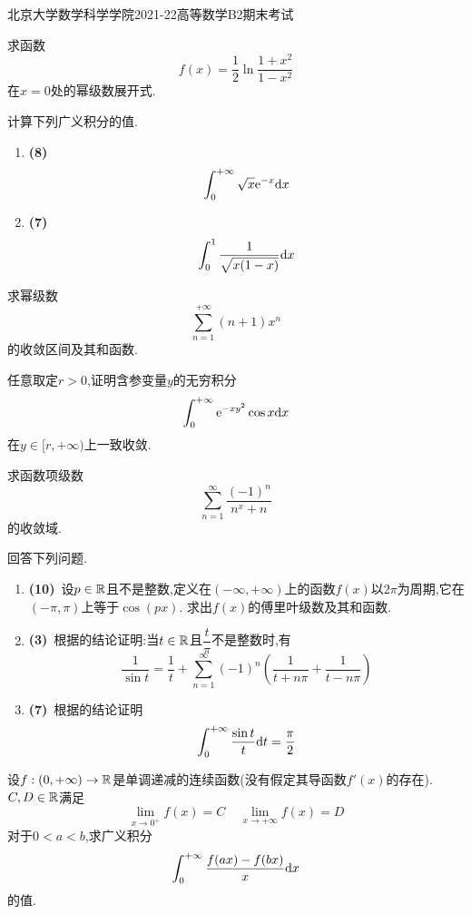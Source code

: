 \documentclass{ctexart}
\begin{document}
\pagestyle{empty}
\begin{center}\Large
    北京大学数学科学学院2021-22高等数学B2期末考试
\end{center}
\begin{problem}[1.(15\songti{分})]
    求函数
    \[f(x)=\dfrac12\ln\dfrac{1+x^2}{1-x^2}\]
    在$x=0$处的幂级数展开式.

\end{problem}

\begin{problem}[2.(15\songti{分})]
    计算下列广义积分的值.
    \begin{enumerate}[label=\tbf{(\arabic*)},topsep=0pt,parsep=0pt,itemsep=0pt,partopsep=0pt]
        \item \textbf{(8)}
            \[\int_0^{+\infty}\sqrt{x}\mathrm{e}^{-x}\mathrm{d} x\]
        \item \textbf{(7)}\ 
            \[\int_0^1\dfrac{1}{\sqrt{x(1-x)}}\mathrm{d} x\]
    \end{enumerate}

\end{problem}

\begin{problem}[3.(15\songti{分})]
    求幂级数
    \[\sum_{n=1}^{+\infty}(n+1)x^n\]
    的收敛区间及其和函数.

\end{problem}

\begin{problem}[4.(15\songti{分})]
    任意取定$r>0$,证明含参变量$y$的无穷积分
    \[\int_0^{+\infty}\mathrm{e}^{-xy^2}\cos x\mathrm{d} x\]
    在$y\in[r,+\infty)$上一致收敛.
        
\end{problem}

\begin{problem}[5.(10\songti{分})]
    求函数项级数
    \[\sum_{n=1}^\infty\dfrac{(-1)^n}{n^x+n}\]
    的收敛域.
\end{problem}

\begin{problem}[6.(20)]
    回答下列问题.
    \begin{enumerate}[label=\tbf{(\arabic*)},topsep=0pt,parsep=0pt,itemsep=0pt,partopsep=0pt]
        \item \textbf{(10\songti{分})}\ 设$p\in\mathbb{R}$且不是整数,定义在$(-\infty,+\infty)$上的函数$f(x)$以$2\pi$为周期,它在$(-\pi,\pi)$上等于$\cos(px)$.%
            求出$f(x)$的傅里叶级数及其和函数.
        \item \textbf{(3)}\ 根据的结论证明:当$t\in\mathbb{R}$且$\dfrac{t}{\pi}$不是整数时,有
            \[\dfrac{1}{\sin t}=\dfrac1t+\sum_{n=1}^{\infty}(-1)^n\left(\dfrac{1}{t+n\pi}+\dfrac{1}{t-n\pi}\right)\]
        \item \textbf{(7\songti{分})}\ 根据\tbf{(2)}的结论证明
            \[\int_0^{+\infty}\dfrac{\sin t}{t}\mathrm{d} t=\dfrac\pi2\]

    \end{enumerate}
\end{problem}

\begin{problem}[7.(10\songti{分})]
    设$f:(0,+\infty)\to\mathbb{R}$是单调递减的连续函数(没有假定其导函数$f'(x)$的存在).%
    $C,D\in\mathbb{R}$满足
    \[\lim_{x\to0^+}f(x)=C\ \ \ \ \ \lim_{x\to+\infty}f(x)=D\]
    对于$0<a<b$,求广义积分
    \[\int_0^{+\infty}\dfrac{f(ax)-f(bx)}{x}\mathrm{d} x\]
    的值.

\end{problem}
\end{document}
